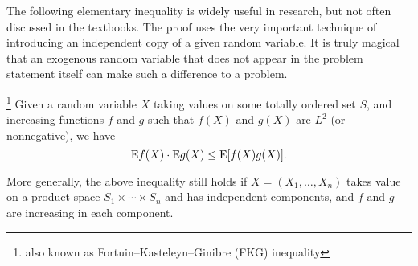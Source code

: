 The following elementary inequality is widely useful in research, but not often discussed in the textbooks. The proof uses the very important technique of introducing an independent copy of a given random variable. It is truly magical that an exogenous random variable that does not appear in the problem statement itself can make such a difference to a problem. 
\begin{namedthm} \footnote{also known as Fortuin--Kasteleyn--Ginibre (FKG) inequality}
    Given a random variable $X$ taking values on some totally ordered set $S$, and increasing functions $f$ and $g$ such that $f(X)$ and $g(X)$ are $L^2$ (or nonnegative), we have \[
        \mathop{}\!\mathrm{E} f(X)\cdot \mathop{}\!\mathrm{E} g(X)\leq \mathop{}\!\mathrm{E}[f(X)g(X)].
    \]

    More generally, the above inequality still holds if $X = (X_1,\dotsc,X_n)$ takes value on a product space $S_1\times \dotsb \times S_n$ and has independent components, and $f$ and $g$ are increasing in each component.
\end{namedthm}


